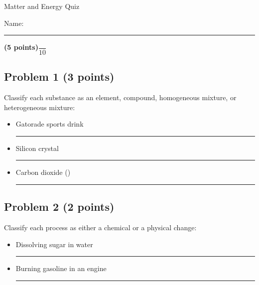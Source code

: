 \documentclass[12pt, letterpaper]{memoir}
\begin{document}
	\begin{center}
		{\large	Matter and Energy Quiz}
	\end{center}
	{\large Name: \rule[-1mm]{4in}{.1pt} {\bfseries (5 points)}\hspace{4em}$\dfrac{~}{10}$} 
	\subsection*{Problem 1 (3 points)}
	Classify each substance as an element, compound, homogeneous mixture, or heterogeneous mixture:
	\begin{itemize}
		\item \vspace{2em} Gatorade sports drink \rule[-1mm]{2.5in}{.1pt}				
		\item \vspace{3em} Silicon crystal \rule[-1mm]{2.5in}{.1pt}		
		\item \vspace{3em} Carbon dioxide () \rule[-1mm]{2.5in}{.1pt}		
	\end{itemize}
	
	

	\vspace{3em}
	\subsection*{Problem 2 (2 points)}
	Classify each process as either a chemical or a physical change:
	\begin{itemize}
		\item \vspace{2em} Dissolving sugar in water \rule[-1mm]{2.5in}{.1pt}		
		\item \vspace{3em} Burning gasoline in an engine \rule[-1mm]{2.5in}{.1pt}
	\end{itemize}
	
\end{document}
